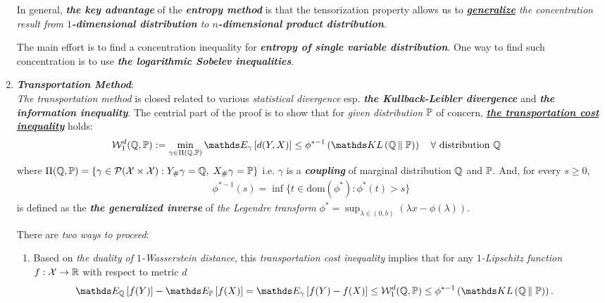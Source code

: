 \documentclass[11pt]{article}
\begin{document}
\begin{enumerate}
In general, \emph{\textbf{the key advantage}} of the \emph{\textbf{entropy method}} is that the tensorization property allows us to \emph{\underline{\textbf{generalize}} the concentration result from \textbf{$1$-dimensional distribution} to \textbf{$n$-dimensional product distribution}}. 

The main effort is to find a concentration inequality for \emph{\textbf{entropy of single variable distribution}}. One way to find such concentration is to use  \emph{\textbf{the logarithmic Sobelev inequalities}}.


\item \emph{\textbf{Transportation Method}}:\\
\emph{The transportation method} is closed related to various \emph{statistical divergence} esp. \emph{\textbf{the Kullback-Leibler divergence}} and \emph{\textbf{the information inequality}}. The centrial part of the proof is to show that for \emph{given distribution} ${\mathbb P}$ of concern, \underline{\emph{\textbf{the transportation cost inequality}}} holds:
\begin{align*}
\cW_{1}^{d}(\bQ, \bP) := \min_{\gamma \in \Pi(\bQ, \bP)}\E{\gamma}{d(Y, X)} &\le \phi^{*-1}\paren{\kl{\bQ}{\bP}} \quad \forall \text{ distribution } \bQ
\end{align*} where $\Pi({\mathbb Q}, {\mathbb P})= \left\{ \gamma \in {\mathcal P}({\mathcal X} \times {\mathcal X}):  Y_{\#}\gamma = {\mathbb Q}, \; X_{\#}\gamma = {\mathbb P} \right\}$ i.e. $\gamma$ is a \emph{\textbf{coupling}} of marginal distribution  ${\mathbb Q}$ and ${\mathbb P}$. And, for every $s \ge 0$, 
\begin{align*}
\phi^{*-1}(s) = \inf\{t \in \text{dom}(\phi^{*}): \phi^{*}(t) > s\}
\end{align*}  is defined as the \textbf{\emph{the generalized inverse}} of \emph{the Legendre transform} $\phi^{*}= \sup_{\lambda \in (0,b)}(\lambda x - \phi(\lambda))$. 

There are \emph{two ways to proceed}:
\begin{enumerate}
\item Based on \emph{the duality of $1$-Wasserstein distance}, this \emph{transportation cost inequality} implies that for any \emph{$1$-Lipschitz function} $f: {\mathcal X} \to {\mathbb R}$ with respect to metric $d$
\begin{align*}
\E{\bQ}{f(Y)} - \E{\bP}{f(X)} = \E{\gamma}{f(Y) - f(X)} &\le \cW_{1}^{d}(\bQ, \bP)  \le \phi^{*-1}\paren{\kl{\bQ}{\bP}}.
\end{align*} 


\end{enumerate}
\end{enumerate}
\end{document}
